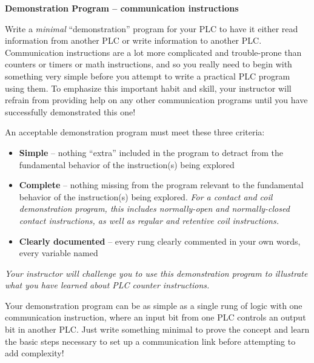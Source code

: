 

\noindent
{\bf Demonstration Program -- communication instructions} 

\vskip 10pt

Write a {\it minimal} ``demonstration'' program for your PLC to have it either read information from another PLC or write information to another PLC.  Communication instructions are a lot more complicated and trouble-prone than counters or timers or math instructions, and so you really need to begin with something very simple before you attempt to write a practical PLC program using them.  To emphasize this important habit and skill, your instructor will refrain from providing help on any other communication programs until you have successfully demonstrated this one!

\vskip 10pt

An acceptable demonstration program must meet these three criteria:

\begin{itemize}
\item{} {\bf Simple} -- nothing ``extra'' included in the program to detract from the fundamental behavior of the instruction(s) being explored
\vskip 5pt
\item{} {\bf Complete} -- nothing missing from the program relevant to the fundamental behavior of the instruction(s) being explored.  {\it For a contact and coil demonstration program, this includes normally-open and normally-closed contact instructions, as well as regular and retentive coil instructions.}
\vskip 5pt
\item{} {\bf Clearly documented} -- every rung clearly commented in your own words, every variable named
\end{itemize}

{\it Your instructor will challenge you to use this demonstration program to illustrate what you have learned about PLC counter instructions.}

\vskip 10pt

Your demonstration program can be as simple as a single rung of logic with one communication instruction, where an input bit from one PLC controls an output bit in another PLC.  Just write something minimal to prove the concept and learn the basic steps necessary to set up a communication link before attempting to add complexity!  

